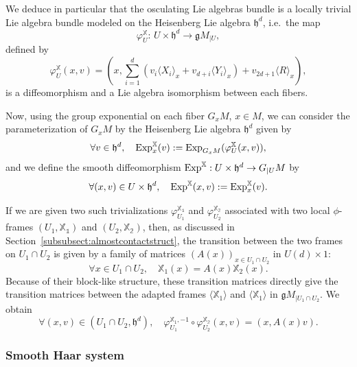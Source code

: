 \documentclass[12pt,a4paper]{amsart}
\theoremstyle{plain}
\theoremstyle{definition}
\theoremstyle{remark}
\numberwithin{equation}{section}
\theoremstyle{definition}
\def \Exp{{\rm Exp}}
\def \bX{\mathbb{X}}
\def \fg{\mathfrak{g}}
\def \fh{\mathfrak{h}}
\numberwithin{equation}{section}
\begin{document}
\vspace{0.25cm}

We deduce in particular that the osculating Lie algebras bundle is a locally trivial Lie algebra bundle modeled on the Heisenberg Lie algebra $\fh^d$, i.e.~the map 
\begin{equation*}
 \varphi_{U}^{\bX}:\,U\times\fh^d \longrightarrow \fg M_{|U},
\end{equation*}
defined by
\begin{equation*}
 \varphi_{U}^{\bX}(x,v) = \left(x,\sum_{i=1}^d (v_i \langle X_i\rangle_x + v_{d+i}\langle Y_i\rangle_x)+v_{2d+1}\langle R\rangle_x\right),
\end{equation*}
is a diffeomorphism and a Lie algebra isomorphism between each fibers. 

Now, using the group exponential on each fiber $G_x M$, $x\in M$, we can consider the parameterization of $G_x M$ by the Heisenberg Lie algebra $\fh^d$ given by 
\begin{equation*}
    \forall v\in\fh^d,\quad \Exp_{x}^\bX(v) := \Exp_{G_x M}(\varphi_{U}^\bX(x,v)),
\end{equation*}
and we define the smooth diffeomorphism $\Exp^\bX: U\times\fh^d \rightarrow G_{|U}M$ by 
\begin{equation*}
    \forall (x,v)\in U\times\fh^d,\quad \Exp^\bX(x,v) := \Exp_{x}^\bX(v).
\end{equation*}

If we are given two such trivializations $\varphi_{U_1}^{\mathbb{X_1}}$ and $\varphi_{U_2}^{\mathbb{X_2}}$ associated with two local $\phi$-frames $(U_1,\mathbb{X_1})$ and $(U_2,\mathbb{X_2})$,
then, as discussed in Section~\ref{subsubsect:almostcontactstruct}, the transition between the two frames on $U_1\cap U_2$ is given by a family of matrices $(A(x))_{x\in U_1\cap U_2}$ in 
$U(d)\times 1$:
\begin{equation}
    \label{eq:transitionmaps}
    \forall x\in U_1\cap U_2,\quad \bX_1(x) = A(x)\bX_2(x).
\end{equation}
Because of their block-like structure, these transition matrices directly give the transition matrices between the adapted frames $\langle\bX_1\rangle$ and $\langle\bX_1\rangle$ in $\fg M_{|U_1\cap U_2}$.
We obtain 
\begin{equation*}
 \forall (x,v)\in (U_1\cap U_2,\fh^d),\quad \varphi_{U_1}^{\bX_1,-1}\circ \varphi_{U_2}^{\mathbb{X_2}}(x,v) = (x,A(x)v).
\end{equation*}

\subsubsection{Smooth Haar system}
\label{subsubsect:smoothhaarsys}
\end{document}
